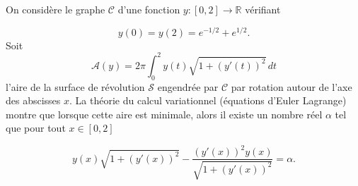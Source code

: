 \begin{exo}
    On considère le graphe $\mathcal{C}$ d'une fonction $y : [0,2] \rightarrow \mathbb{R}$ vérifiant

    \begin{minipage}{10cm}
        \begin{equation}
            y(0)=y(2)=e^{-1/2}+e^{1/2}. \label{contr_bord}
        \end{equation}
        Soit
        \begin{equation}
            \mathcal{A}(y) = 2\pi\int_{0}^{2} y(t) \sqrt{1 + (y'(t))^2}\,dt \label{A}
        \end{equation}
        l'aire de la surface de révolution $\mathcal{S}$ engendrée par $\mathcal{C}$ par rotation autour de l'axe des abscisses $x$.
        La théorie du calcul variationnel (équations d'Euler Lagrange) montre que lorsque cette aire est minimale, alors il existe un nombre réel $\alpha$ tel que pour tout $x \in [0,2]$
    \end{minipage}
    \begin{minipage}{7cm}
        \hfill
        
    \end{minipage}
    \begin{equation}
        y(x)\sqrt{1+(y'(x))^2} - \frac{(y'(x))^2y(x)}{\sqrt{1+(y'(x))^2}} = \alpha . \label{EulerLagrange}
    \end{equation}


\end{exo}
